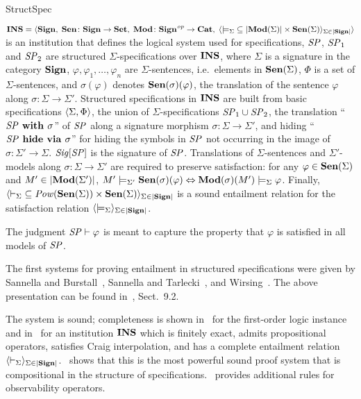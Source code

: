 \begin{entry}{StructSpec}
\begin{clarifications}
  ${\bf INS} = \langle{{\bf Sign},\; {\bf Sen}\colon{\bf Sign}\to{\bf Set},\; {\bf Mod}\colon{\bf Sign}^{\mathit{op}}\to{\bf Cat},\;
          \langle{{\models_\Sigma}\subseteq|{\bf Mod}(\Sigma)|\times{\bf Sen}(\Sigma)}\rangle_{\Sigma\in|{\bf Sign}|}}\rangle$
  is an institution that defines the logical system used for specifications,
  $\mathit{SP}$, $\mathit{SP}_1$ and $\mathit{SP}_2$ are structured $\Sigma$-specifications over ${\bf INS}$,
  where $\Sigma$ is a signature in the category ${\bf Sign}$, $\varphi, \varphi_1,
  \ldots, \varphi_n$ are $\Sigma$-sentences, i.e.\ elements in ${\bf Sen}(\Sigma)$,
  $\Phi$ is a set of $\Sigma$-sentences, and $\sigma(\varphi)$ denotes
  ${\bf Sen}(\sigma)(\varphi)$, the translation of the sentence $\varphi$ along
  $\sigma\colon\Sigma\to\Sigma'$. 
  Structured specifications in ${\bf INS}$ are built from basic specifications
  $\langle{\Sigma, \Phi}\rangle$, the union of $\Sigma$-specifications
  $\mathit{SP}_1 \cup \mathit{SP}_2$, the translation ``$\mathit{SP}\textbf{\upshape{} with }\sigma$'' of $\mathit{SP}$
  along a signature morphism $\sigma\colon\Sigma\to\Sigma'$, and hiding
  ``$\mathit{SP}\textbf{\upshape{} hide via }\sigma$'' for hiding the symbols in $\mathit{SP}$ not occurring in the
  image of $\sigma\colon\Sigma'\to\Sigma$.  $\mathit{Sig}[\mathit{SP}]$ is the signature of
  $\mathit{SP}$.
  Translations of $\Sigma$-sentences and $\Sigma'$-models along 
  $\sigma \colon \Sigma \rightarrow \Sigma'$ 
  are required to preserve satisfaction: for any
  $\varphi \in {\bf Sen}(\Sigma)$ and 
  $M' \in |{\bf Mod}(\Sigma')|$, 
  $M' \models_{\Sigma'} {\bf Sen}(\sigma)(\varphi) 
      \Leftrightarrow {\bf Mod}(\sigma)(M') \models_{\Sigma} \varphi$. 
  Finally,
  $\langle{{\vdash_\Sigma}\subseteq{\mathit{Pow}}({\bf Sen}(\Sigma))\times{\bf Sen}(\Sigma)}\rangle_{\Sigma\in|{\bf Sign}|}$
  is a sound entailment relation for the satisfaction relation
  $\langle{{\models_\Sigma}}\rangle_{\Sigma\in|{\bf Sign}|}$.
  
  The judgment $\mathit{SP} \vdash \varphi$ is meant to capture the property that
  $\varphi$ is satisfied in all models of $\mathit{SP}$.
\end{clarifications}

\begin{history}
  The first systems for proving entailment in structured specifications were
  given by Sannella and Burstall~\cite{SB83}, Sannella and Tarlecki~\cite{ST88},
  and Wirsing~\cite{Wir91}.
  The above presentation can be found in~\cite{ST12}, Sect.~9.2.
\end{history}

 \begin{technicalities}
  The system is sound; completeness is shown in~\cite{Wir91} for the first-order
  logic instance and in~\cite{Bor02,ST12} for an institution ${\bf INS}$ which is
  finitely exact, admits propositional operators, satisfies Craig interpolation,
  and has a complete entailment relation
  $\langle{{\vdash_\Sigma}}\rangle_{\Sigma\in|{\bf Sign}|}$. \cite{ST14}~shows that this is the
  most powerful sound proof system that is compositional in the structure of
  specifications. \cite{RH97}~provides additional rules for observability
  operators.
\end{technicalities}

\end{entry}
